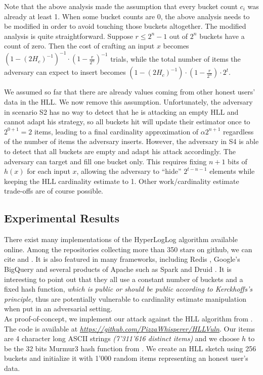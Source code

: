 \documentclass{IEEEtran}
\begin{document}
Note that the above analysis made the assumption that every bucket count $c_i$ was already at least 1. When some bucket counts are 0, the above analysis needs to be modified in order to avoid touching those buckets altogether. The modified analysis is quite straightforward. Suppose $r \le 2^n-1$ out of $2^n$ buckets have a count of zero. Then the cost of crafting an input $x$ becomes $(1-(2H_c)^{-1})^{-1} \cdot (1- \frac{r}{2^n})^{-1}$ trials, while the total number of items the adversary can expect to insert becomes $(1-(2H_c)^{-1}) \cdot (1- \frac{r}{2^n})\cdot 2^t$.

We assumed so far that there are already values coming from other honest users' data in the HLL. We now remove this assumption. Unfortunately, the adversary in scenario S2 has no way to detect that he is attacking an empty HLL and cannot adapt his strategy, so all buckets hit will update their estimator once to $2^{0+1}=2$ items, leading to a final cardinality approximation of $\alpha2^{n+1}$ regardless of the number of items the adversary inserts. However, the adversary in S4 is able to detect that all buckets are empty and adapt his attack accordingly. The adversary can target and fill one bucket only. This requires fixing $n+1$ bits of $h(x)$ for each input $x$, allowing the adversary to ``hide'' $2^{t-n-1}$ elements while keeping the HLL cardinality estimate to 1. Other work/cardinality estimate trade-offs are of course possible.

\subsection{Experimental Results}
There exist many implementations of the HyperLogLog algorithm available online. Among the repositories collecting more than 350 stars on github, we can cite \cite{clahll} and \cite{datasketch}. It is also featured in many frameworks, including Redis \cite{redis}, Google's BigQuery \cite{bigquery} and several products of Apache such as Spark \cite{spahll} \cite{spahll2} and Druid \cite{druhll}. It is interesting to point out that they all use a constant number of buckets and a fixed hash function, \textit{which is public or should be public according to Kerckhoffs's principle,} thus are potentially vulnerable to cardinality estimate manipulation when put in an adversarial setting.\\

As proof-of-concept, we implement our attack against the HLL algorithm from \cite{clahll}. The code is available at \href{https://github.com/PizzaWhisperer/HLLVuln}{\textit{\url{https://github.com/PizzaWhisperer/HLLVuln}}}. Our items are 4 character long ASCII strings \textit{(7'311'616 distinct items)} and we choose $h$ to be the 32 bits Murmur3 hash function from \cite{murmur3code}. We create an HLL sketch using 256 buckets and initialize it with 1'000 random items representing an honest user's data.
\end{document}
